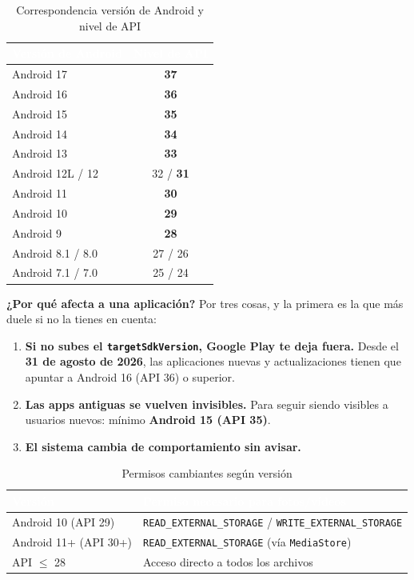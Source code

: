 \documentclass[11pt,a4paper]{article}
\newcommand{\code}[1]{\texttt{\color{primary}#1}}
\newcommand{\campo}[1]{\textbf{\color{primary}#1}}
\begin{document}
	\begin{table}[htbp]
		\centering
		\small
		\begin{tabular}{@{}l c@{}}
			\toprule
			\rowcolor{primary}
			\textcolor{white}{\sffamily\bfseries Versión de Android} & \textcolor{white}{\sffamily\bfseries Nivel de API} \\
			\midrule
			Android 17 & \textbf{37} \\
			\rowcolor{soft}
			Android 16 & \textbf{36} \\
			Android 15 & \textbf{35} \\
			\rowcolor{soft}
			Android 14 & \textbf{34} \\
			Android 13 & \textbf{33} \\
			\rowcolor{soft}
			Android 12L / 12 & 32 / \textbf{31} \\
			Android 11 & \textbf{30} \\
			\rowcolor{soft}
			Android 10 & \textbf{29} \\
			Android 9 & \textbf{28} \\
			\rowcolor{soft}
			Android 8.1 / 8.0 & 27 / 26 \\
			Android 7.1 / 7.0 & 25 / 24 \\
			\bottomrule
		\end{tabular}
		\caption{Correspondencia versión de Android y nivel de API}
	\end{table}
	
	\campo{¿Por qué afecta a una aplicación?}
	Por tres cosas, y la primera es la que más duele si no la tienes en cuenta:
	\begin{enumerate}[leftmargin=*,itemsep=0.15em]
		\item \textbf{Si no subes el \code{targetSdkVersion}, Google Play te deja fuera.} Desde el \textbf{31 de agosto de 2026}, las aplicaciones nuevas y actualizaciones tienen que apuntar a Android 16 (API 36) o superior.
		\item \textbf{Las apps antiguas se vuelven invisibles.} Para seguir siendo visibles a usuarios nuevos: mínimo \textbf{Android 15 (API 35)}.
		\item \textbf{El sistema cambia de comportamiento sin avisar.}
	\end{enumerate}
	
	\begin{table}[htbp]
		\centering
		\small
		\begin{tabular}{@{}l l@{}}
			\toprule
			\rowcolor{primary}
			\textcolor{white}{\sffamily\bfseries Versión} & \textcolor{white}{\sffamily\bfseries Permiso necesario para fotos/vídeos} \\
			\midrule
			Android 10 (API 29) & \code{READ\_EXTERNAL\_STORAGE} / \code{WRITE\_EXTERNAL\_STORAGE} \\
			\rowcolor{soft}
			Android 11+ (API 30+) & \code{READ\_EXTERNAL\_STORAGE} (vía \code{MediaStore}) \\
			API $\leq$ 28 & Acceso directo a todos los archivos \\
			\bottomrule
		\end{tabular}
		\caption{Permisos cambiantes según versión}
	\end{table}
	
\end{document}

